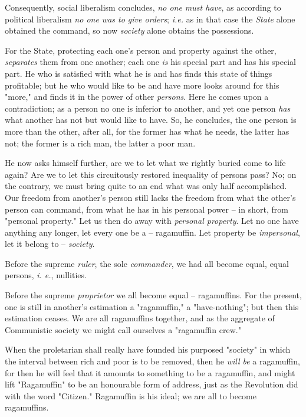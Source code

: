 Consequently, social liberalism concludes, \textit{no one must have}, as 
according to political liberalism \textit{no one was to give orders}; 
\textit{i.e.} as in that case the \textit{State} alone obtained the command, 
so now \textit{society} alone obtains the possessions.

For the State, protecting each one's person and property against the other, 
\textit{separates} them from one another; each one \textit{is} his special 
part and has his special part. He who is satisfied with what he is and has 
finds this state of things profitable; but he who would like to be and have 
more looks around for this "{}more,"{} and finds it in the power of other 
\textit{persons}. Here he comes upon a contradiction; as a person no one is 
inferior to another, and yet one person \textit{has} what another has not but 
would like to have. So, he concludes, the one person is more than the other, 
after all, for the former has what he needs, the latter has not; the former is 
a rich man, the latter a poor man.

He now asks himself further, are we to let what we rightly buried come to life 
again? Are we to let this circuitously restored inequality of persons pass? 
No; on the contrary, we must bring quite to an end what was only half 
accomplished. Our freedom from another's person still lacks the freedom from 
what the other's person can command, from what he has in his personal power -- 
in short, from "{}personal property."{} Let us then do away with 
\textit{personal property}. Let no one have anything any longer, let every one 
be a -- ragamuffin. Let property be \textit{impersonal}, let it belong to -- 
\textit{society}.

Before the supreme \textit{ruler}, the sole \textit{commander}, we had all 
become equal, equal persons, \textit{i. e.}, nullities.

Before the supreme \textit{proprietor} we all become equal -- ragamuffins. For 
the present, one is still in another's estimation a "{}ragamuffin,"{} a 
"{}have-nothing"{}; but then this estimation ceases. We are all ragamuffins 
together, and as the aggregate of Communistic society we might call ourselves 
a "{}ragamuffin crew."{}

When the proletarian shall really have founded his purposed "{}society"{} in 
which the interval between rich and poor is to be removed, then he 
\textit{will be} a ragamuffin, for then he will feel that it amounts to 
something to be a ragamuffin, and might lift "{}Ragamuffin"{} to be an 
honourable form of address, just as the Revolution did with the word 
"{}Citizen."{} Ragamuffin is his ideal; we are all to become ragamuffins.

